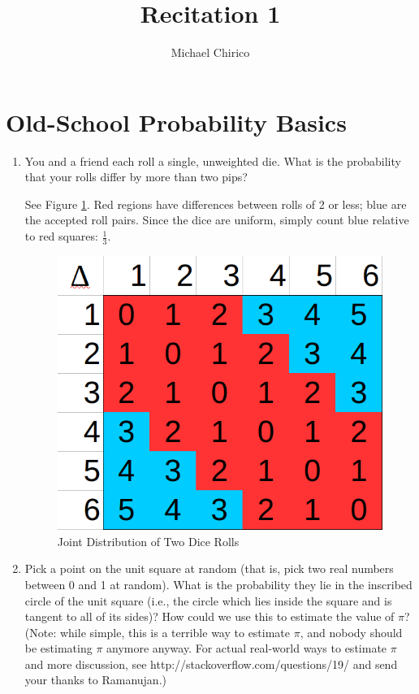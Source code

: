 \documentclass{article}
\newenvironment{solution}{\color{red}}{\color{black}}
\begin{document}
\title{Recitation 1}
\author{Michael Chirico}

\maketitle

\section{Old-School Probability Basics}

\begin{enumerate}
\item You and a friend each roll a single, unweighted die. What is the probability that your rolls differ by more than two pips?

\begin{solution}
See Figure \ref{fig:dice}. Red regions have differences between rolls of 2 or less; blue are the accepted roll pairs. Since the dice are uniform, simply count blue relative to red squares: $\frac13$.

\begin{figure}[htbp]
\centering
\caption{Joint Distribution of Two Dice Rolls}
\label{fig:dice}
\includegraphics[width = .5\textwidth]{recitation160901_fig1}
\end{figure}
\end{solution}

\item Pick a point on the unit square at random (that is, pick two real numbers between 0 and 1 at random). What is the probability they lie in the inscribed circle of the unit square (i.e., the circle which lies inside the square and is tangent to all of its sides)? How could we use this to estimate the value of $\pi$? (Note: while simple, this is a terrible way to estimate $\pi$, and nobody should be estimating $\pi$ anymore anyway. For actual real-world ways to estimate $\pi$ and more discussion, see http://stackoverflow.com/questions/19/ and send your thanks to Ramanujan.)


\end{enumerate}
\end{document}
